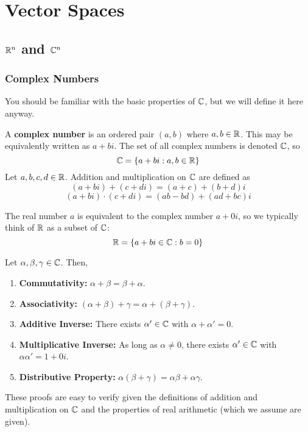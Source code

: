 \chapter{Vector Spaces}
\section{$\mathbb{R}^n$ and $\mathbb{C}^n$}
\subsection*{Complex Numbers}
You should be familiar with the basic properties of $\mathbb{C}$, but we will define it here anyway.
\begin{definition}
    A \textbf{complex number} is an ordered pair $(a,b)$ where $a,b\in \mathbb{R}$. This may be equivalently written as $a+bi$. The set of all complex numbers is denoted $\mathbb{C}$, so
    \[ \mathbb{C} = \{a + bi: a,b\in\mathbb{R}\} \]
    Let $a,b,c,d\in\mathbb{R}$. Addition and multiplication on $\mathbb{C}$ are defined as
    \[ (a+bi)+(c+di) = (a+c) + (b+d)i \]
    \[ (a+bi)\cdot (c+di) = (ab - bd) + (ad + bc)i\]
\end{definition}
The real number $a$ is equivalent to the complex number $a+0i$, so we typically think of $\mathbb{R}$ as a subset of $\mathbb{C}$:
\[ \mathbb{R} = \{a+bi \in \mathbb{C} : b = 0\} \]
\begin{theorem}
    Let $\alpha, \beta,\gamma \in \mathbb{C}$. Then,
    \begin{enumerate}
        \item \textbf{Commutativity:} $\alpha + \beta = \beta + \alpha$.
        \item \textbf{Associativity:} $(\alpha + \beta) + \gamma = \alpha + (\beta + \gamma)$.
        \item \textbf{Additive Inverse:} There exists $\alpha'\in \mathbb{C}$ with $\alpha + \alpha' = 0$.
        \item \textbf{Multiplicative Inverse:} As long as $\alpha\ne 0$, there exists $\alpha'\in \mathbb{C}$ with $\alpha\alpha' = 1 + 0i$.
        \item \textbf{Distributive Property:} $\alpha(\beta + \gamma) = \alpha\beta + \alpha\gamma$.    
    \end{enumerate}
\end{theorem}
These proofs are easy to verify given the definitions of addition and multiplication on $\mathbb{C}$ and the properties of real arithmetic (which we assume are given).
